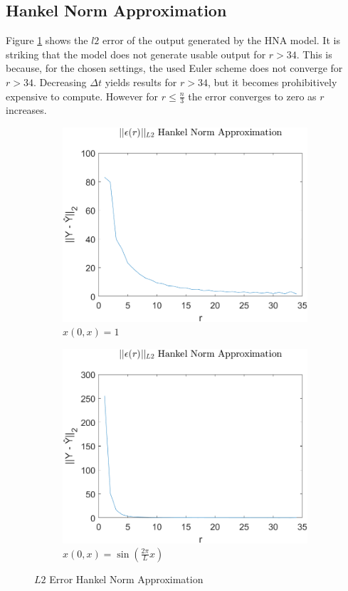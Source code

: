 \subsection{Hankel Norm Approximation}
Figure \ref{FIG-ERR-HNA} shows the \(l2\) error of the output generated by the HNA model.
It is striking that the model does not generate usable output for \(r > 34\).
This is because, for the chosen settings, the used Euler scheme does not converge for \(r > 34\).
Decreasing \(\Delta t\) yields results for \(r > 34\), but it becomes prohibitively expensive to compute.
However for \(r \leq \frac{n}{3}\) the error converges to zero as \(r\) increases.

\begin{figure}[H]
\begin{subfigure}[b]{0.5\textwidth}
\centering
\includegraphics[width=\textwidth]{images/L2_HNA}
\caption{$x(0, x) = 1$}
\label{FIG-ERR-HNA}
\end{subfigure}
\begin{subfigure}[b]{0.5\textwidth}
\centering
\includegraphics[width=\textwidth]{images/L2_HNA_SIN}
\caption{$x(0, x) = \sin(\frac{2\pi}{L}x)$}
\label{FIG-ERR-HNA-SIN}
\end{subfigure}
\caption{\(L2\) Error Hankel Norm Approximation}
\end{figure}
